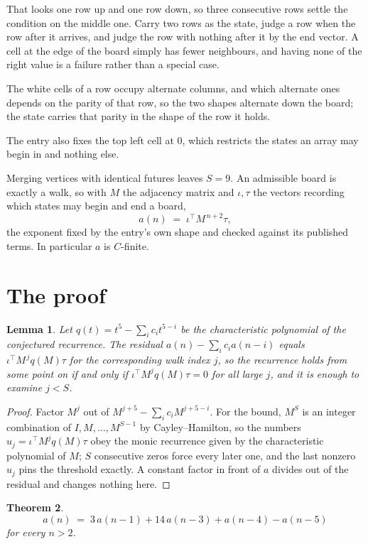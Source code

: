 \documentclass[11pt,a4paper]{article}
\theoremstyle{plain}
\newtheorem{theorem}{Theorem}
\newtheorem{lemma}[theorem]{Lemma}
\theoremstyle{definition}
\begin{document}
That looks one row up and one row down, so three consecutive rows settle the condition on the middle one. Carry two rows as the state, judge a row when the row after it arrives, and judge the row with nothing after it by the end vector. A cell at the edge of the board simply has fewer neighbours, and having none of the right value is a failure rather than a special case.

The white cells of a row occupy alternate columns, and which alternate ones depends on the parity of that row, so the two shapes alternate down the board; the state carries that parity in the shape of the row it holds.

The entry also fixes the top left cell at $0$, which restricts the states an array may begin in and nothing else.

Merging vertices with identical futures leaves $S=9$. An admissible board is exactly a walk, so with $M$ the adjacency matrix and $\iota,\tau$ the vectors recording which states may begin and end a board,
\[
a(n)\;=\;\iota^{\!\top}M^{\,n+2}\tau ,
\]
the exponent fixed by the entry's own shape and checked against its published terms. In
particular $a$ is $C$-finite.

\section{The proof}

\begin{lemma}\label{lem:crit}
Let $q(t)=t^{5}-\sum_i c_it^{5-i}$ be the characteristic polynomial of the
conjectured recurrence. The residual $a(n)-\sum_ic_ia(n-i)$ equals
$\iota^{\!\top}M^{\,j}q(M)\tau$ for the corresponding walk index $j$, so the recurrence
holds from some point on if and only if $\iota^{\!\top}M^{j}q(M)\tau=0$ for all large $j$,
and it is enough to examine $j<S$.
\end{lemma}

\begin{proof}
Factor $M^{j}$ out of $M^{j+5}-\sum_ic_iM^{j+5-i}$. For the bound, $M^{S}$
is an integer combination of $I,M,\dots,M^{S-1}$ by Cayley--Hamilton, so the numbers
$u_j=\iota^{\!\top}M^{j}q(M)\tau$ obey the monic recurrence given by the characteristic
polynomial of $M$; $S$ consecutive zeros force every later one, and the last nonzero $u_j$
pins the threshold exactly. A constant factor in front of $a$ divides out of the residual and
changes nothing here.
\end{proof}

\begin{theorem}
\[
a(n)\;=\;3\,a(n-1) + 14\,a(n-3) + a(n-4) - a(n-5)
\]
for every $n>2$.
\end{theorem}
\end{document}
